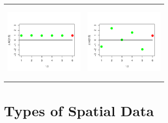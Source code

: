\documentclass[mathserif,compress]{beamer}\usepackage{graphicx, color}
\begin{document}
\begin{frame} [fragile]
	\begin{tabular} {p{4.5cm} p{4.5cm}}
		\begin{center}
		  \vspace{-1.3cm}
			\includegraphics[width=4.0cm]{figure/AutoCor-EstPredFig1} 
		\end{center} &
		\begin{center}
		  \vspace{-1.3cm}
			\includegraphics[width=4.0cm]{figure/AutoCor-EstPredFig2} 
		\end{center} 
	\end{tabular}
\end{frame}

\section{Types of Spatial Data}
\end{document}
